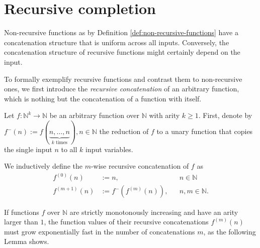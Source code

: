 \section{Recursive completion}
\label{sec:recursive-completion}
Non-recursive functions as by Definition \ref{def:non-recursive-functions} have a concatenation structure that is uniform across all inputs. 
Conversely, the concatenation structure of recursive functions might certainly depend on the input.


To formally exemplify recursive functions and contrast them to non-recursive ones, we first introduce the \textit{recursive concatenation} of an arbitrary function, which is nothing but the concatenation of a function with itself.
\begin{definition}
	\label{def:recursive-concatenation}
	Let $f:\mathbb{N}^k\to\mathbb{N}$ be an arbitrary function over $\mathbb{N}$ with arity $k\geq 1$.
	First, denote by $f^{-}(n):=f(\underbrace{n,\dots,n}_{k \text{ times}}),n\in\mathbb{N}$ the reduction of $f$ to a unary function that copies the single input $n$ to all $k$ input variables.
	
	We inductively define the $m$-wise recursive concatenation of $f$ as
	\begin{align}
		f^{(0)}(n)&:=n, && n\in\mathbb{N}\\
		f^{(m+1)}(n)&:=f^{-}(f^{(m)}(n)),&& n,m\in\mathbb{N}.
	\end{align}
\end{definition}

If functions $f$ over $\mathbb{N}$ are strictly monotonously increasing and have an arity larger than $1$, the function values of their recursive concatenations $f^{(m)}(n)$ must grow exponentially fast in the number of concatenations $m$, as the following Lemma shows.

